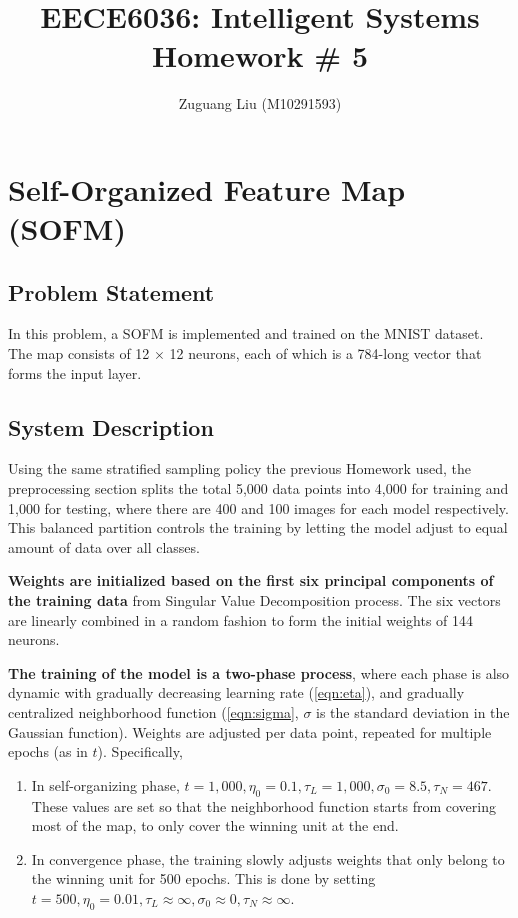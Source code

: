 \documentclass[11pt,titlepage]{article}
\title{EECE6036: Intelligent Systems\\Homework \# 5}
\author{Zuguang Liu (M10291593)}
\begin{document}
\maketitle

\section{Self-Organized Feature Map (SOFM)}





\subsection{Problem Statement}

In this problem, a SOFM is implemented and trained on the MNIST dataset. The map consists of 12 $\times$ 12 neurons, each of which is a 784-long vector that forms the input layer. 









\subsection{System Description}
Using the same stratified sampling policy the previous Homework used, the preprocessing section splits the total 5,000 data points into 4,000 for training and 1,000 for testing, where there are 400 and 100 images for each model respectively. This balanced partition controls the training by letting the model adjust to equal amount of data over all classes. 

\textbf{Weights are initialized based on the first six principal components of the training data} from Singular Value Decomposition process. The six vectors are linearly combined in a random fashion to form the initial weights of 144 neurons.

\textbf{The training of the model is a two-phase process}, where each phase is also dynamic with gradually decreasing learning rate (\ref{eqn:eta}), and gradually centralized neighborhood function (\ref{eqn:sigma}, $\sigma$ is the standard deviation in the Gaussian function). Weights are adjusted per data point, repeated for multiple epochs (as in $t$). Specifically,

\begin{enumerate}
	\item In self-organizing phase, $t = 1,000, \eta_0 = 0.1, \tau_L=1,000, \sigma_0 = 8.5, \tau_N = 467$. These values are set so that the neighborhood function starts from covering most of the map, to only cover the winning unit at the end.
	
	\item In convergence phase, the training slowly adjusts weights that only belong to the winning unit for 500 epochs. This is done by setting $t = 500, \eta_0 = 0.01, \tau_L \approx \infty, \sigma_0 \approx 0, \tau_N \approx \infty$.
\end{enumerate}
\end{document}
